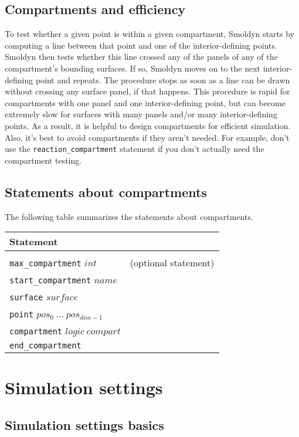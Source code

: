 \documentclass {scrbook}
\newcommand {\ttt} {\texttt}
\begin{document}
\section{Compartments and efficiency}

To test whether a given point is within a given compartment, Smoldyn starts by computing a line between that point and one of the interior-defining points. Smoldyn then tests whether this line crossed any of the panels of any of the compartment's bounding surfaces. If so, Smoldyn moves on to the next interior-defining point and repeats. The procedure stops as soon as a line can be drawn without crossing any surface panel, if that happens. This procedure is rapid for compartments with one panel and one interior-defining point, but can become extremely slow for surfaces with many panels and/or many interior-defining points. As a result, it is helpful to design compartments for efficient simulation. Also, it's best to avoid compartments if they aren't needed. For example, don't use the \ttt{reaction\_compartment} statement if you don't actually need the compartment testing.

\section{Statements about compartments}

The following table summarizes the statements about compartments.

\begin{longtable}[c]{ll}
Statement\\
\hline \\
\ttt{max\_compartment} $int$ & (optional statement)\\
\ttt{start\_compartment} $name$\\
\ttt{surface} $surface$\\
\ttt{point} $pos_0\ ...\ pos_{dim-1}$\\
\ttt{compartment} $logic\ compart$\\
\ttt{end\_compartment}
\end{longtable}

\chapter{Simulation settings}

\section{Simulation settings basics}
\end{document}
